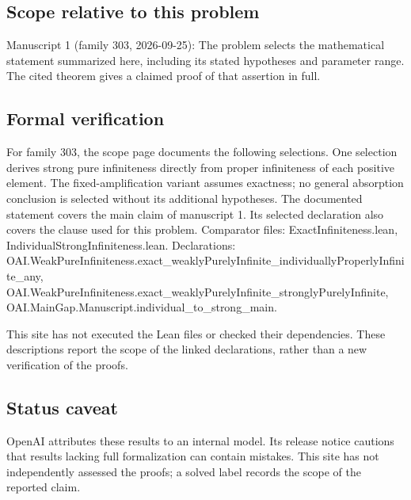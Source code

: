 \documentclass[11pt]{article}
\begin{document}
\subsection{Scope relative to this problem}
Manuscript 1 (family 303, 2026-09-25): The problem selects the mathematical statement summarized here, including its stated hypotheses and parameter range. The cited theorem gives a claimed proof of that assertion in full.

\subsection{Formal verification}
For family 303, the scope page documents the following selections. One selection derives strong pure infiniteness directly from proper infiniteness of each positive element. The fixed-amplification variant assumes exactness; no general absorption conclusion is selected without its additional hypotheses. The documented statement covers the main claim of manuscript 1. Its selected declaration also covers the clause used for this problem. Comparator files: ExactInfiniteness.lean, IndividualStrongInfiniteness.lean. Declarations: OAI.WeakPureInfiniteness.exact\_weaklyPurelyInfinite\_individuallyProperlyInfinite\_any, OAI.WeakPureInfiniteness.exact\_weaklyPurelyInfinite\_stronglyPurelyInfinite, OAI.MainGap.Manuscript.individual\_to\_strong\_main.

This site has not executed the Lean files or checked their dependencies. These descriptions report the scope of the linked declarations, rather than a new verification of the proofs.

\subsection{Status caveat}
OpenAI attributes these results to an internal model. Its release notice cautions that results lacking full formalization can contain mistakes. This site has not independently assessed the proofs; a solved label records the scope of the reported claim.
\end{document}
